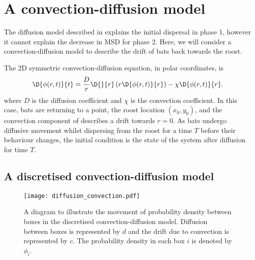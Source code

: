 \section{A convection-diffusion model}
The diffusion model described in  explains the initial dispersal in phase 1, however it cannot explain the decrease in MSD for phase 2. Here, we will consider a convection-diffusion model to describe the drift of bats back towards the roost.

The 2D symmetric convection-diffusion equation, in polar coordinates, is
%
\begin{equation}
  \D{\phi(r,t)}{t} = \frac{D}{r} \D{}{r}\left(r \D{\phi(r,t)}{r} \right) - \chi \D{\phi(r,t)}{r}.
  \label{eqn:convection}
\end{equation}
%
where $D$ is the diffusion coefficient and $\chi$ is the convection coefficient. In this case, bats are returning to a point, the roost location $(x_0,y_0)$, and the convection component of  describes a drift towards $r=0$. As bats undergo diffusive movement whilst dispersing from the roost for a time $T$ before their behaviour changes, the initial condition is the state of the system after diffusion for time $T$.

\subsection{A discretised convection-diffusion model}


 \begin{figure} [b]
     \centering
         \texttt{[image: diffusion\_convection.pdf]}
         \caption{A diagram to illustrate the movement of probability density between boxes in the discretised convection-diffusion model. Diffusion between boxes is represented by $d$ and the drift due to convection is represented by $c$. The probability density in each box $i$ is denoted by $\phi_i$.}
     \label{fig:convection_diffusion_diag}
 \end{figure}

